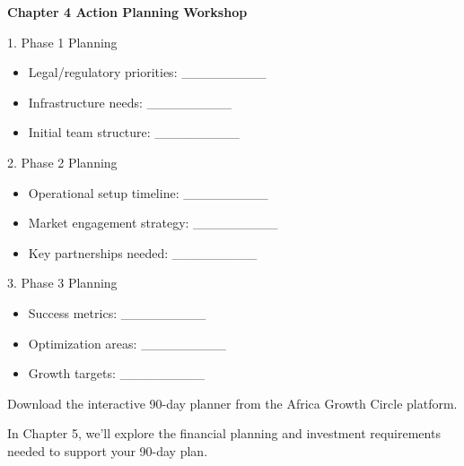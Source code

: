 \begin{workshopbox}
\textbf{Chapter 4 Action Planning Workshop}

1. Phase 1 Planning
\begin{itemize}
    \item Legal/regulatory priorities: \_\_\_\_\_\_\_\_\_
    \item Infrastructure needs: \_\_\_\_\_\_\_\_\_
    \item Initial team structure: \_\_\_\_\_\_\_\_\_
\end{itemize}

2. Phase 2 Planning
\begin{itemize}
    \item Operational setup timeline: \_\_\_\_\_\_\_\_\_
    \item Market engagement strategy: \_\_\_\_\_\_\_\_\_
    \item Key partnerships needed: \_\_\_\_\_\_\_\_\_
\end{itemize}

3. Phase 3 Planning
\begin{itemize}
    \item Success metrics: \_\_\_\_\_\_\_\_\_
    \item Optimization areas: \_\_\_\_\_\_\_\_\_
    \item Growth targets: \_\_\_\_\_\_\_\_\_
\end{itemize}

Download the interactive 90-day planner from the Africa Growth Circle platform.
\end{workshopbox}

\begin{importantbox}
In Chapter 5, we'll explore the financial planning and investment requirements needed to support your 90-day plan.
\end{importantbox}